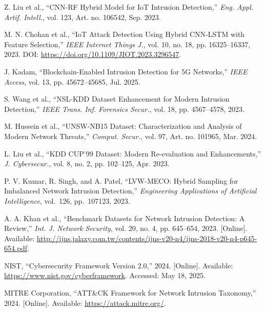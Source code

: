 \documentclass[conference]{IEEEtran}
\begin{document}
\begin{thebibliography}{00}
Z. Liu et al., ``CNN-RF Hybrid Model for IoT Intrusion Detection,'' \textit{Eng. Appl. Artif. Intell.}, vol. 123, Art. no. 106542, Sep. 2023.

M. N. Chohan et al., ``IoT Attack Detection Using Hybrid CNN-LSTM with Feature Selection,'' \textit{IEEE Internet Things J.}, vol. 10, no. 18, pp. 16325–16337, 2023. DOI: \url{https://doi.org/10.1109/JIOT.2023.3296547}.

J. Kadam, ``Blockchain-Enabled Intrusion Detection for 5G Networks,'' \textit{IEEE Access}, vol. 13, pp. 45672--45685, Jul. 2025.

S. Wang et al., ``NSL-KDD Dataset Enhancement for Modern Intrusion Detection,'' \textit{IEEE Trans. Inf. Forensics Secur.}, vol. 18, pp. 4567--4578, 2023.

M. Hussein et al., ``UNSW-NB15 Dataset: Characterization and Analysis of Modern Network Threats,'' \textit{Comput. Secur.}, vol. 97, Art. no. 101965, Mar. 2024.

L. Liu et al., ``KDD CUP'99 Dataset: Modern Re-evaluation and Enhancements,'' \textit{J. Cybersecur.}, vol. 8, no. 2, pp. 102--125, Apr. 2023.

P. V. Kumar, R. Singh, and A. Patel, 
``LVW-MECO: Hybrid Sampling for Imbalanced Network Intrusion Detection,'' 
\textit{Engineering Applications of Artificial Intelligence}, 
vol.~126, pp.~107123, 2023. 

A. A. Khan et al., ``Benchmark Datasets for Network Intrusion Detection: A Review,'' \textit{Int. J. Network Security}, vol. 20, no. 4, pp. 645--654, 2023. [Online]. Available: \url{http://ijns.jalaxy.com.tw/contents/ijns-v20-n4/ijns-2018-v20-n4-p645-654.pdf}.

NIST, ``Cybersecurity Framework Version 2.0,'' 2024. [Online]. Available: \url{https://www.nist.gov/cyberframework}. Accessed: May 18, 2025.

MITRE Corporation, ``ATT\&CK Framework for Network Intrusion Taxonomy,'' 2024. [Online]. Available: \url{https://attack.mitre.org/}.

\end{thebibliography}
\end{document}

